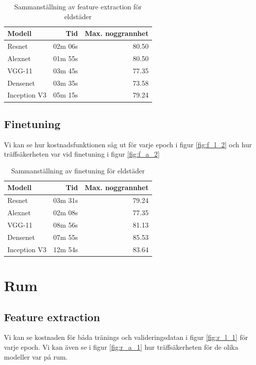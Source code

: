 \documentclass[]{kththesis}
\begin{document}

\begin{table}[!htbp]
  \centering
  \begin{tabular}{|l|r|r|}
    Modell & Tid & Max. noggrannhet \\ 
    \hline
    Resnet       & 02m 06s & 80.50 \\
    Alexnet      & 01m 55s & 80.50 \\
    VGG-11       & 03m 45s & 77.35 \\
    Densenet     & 03m 35s & 73.58 \\
    Inception V3 & 05m 15s & 79.24 \\
  \end{tabular}
  \caption{Sammanställning av feature extraction för eldstäder}
\end{table}



\subsection{Finetuning}
Vi kan se hur kostnadsfunktionen såg ut för varje epoch i figur \ref{fig:f_l_2} och hur träffsäkerheten var vid finetuning i figur \ref{fig:f_a_2}

\begin{table}
  \centering
  \begin{tabular}{|l|r|r|}
    Modell & Tid & Max. noggrannhet \\ 
    \hline
    Resnet       & 03m 31s & 79.24 \\
    Alexnet      & 02m 08s & 77.35 \\
    VGG-11       & 08m 56s & 81.13 \\
    Densenet     & 07m 55s & 85.53 \\
    Inception V3 & 12m 54s & 83.64 \\
  \end{tabular}
  \caption{Sammanställning av finetuning för eldstäder}
\end{table}


\section{Rum}

\subsection{Feature extraction}
Vi kan se kostnaden för båda tränings och valideringsdatan i figur \ref{fig:r_l_1} för varje epoch. Vi kan även se i figur \ref{fig:r_a_1} hur träffsäkerheten för de olika modeller var på rum.
\end{document}
